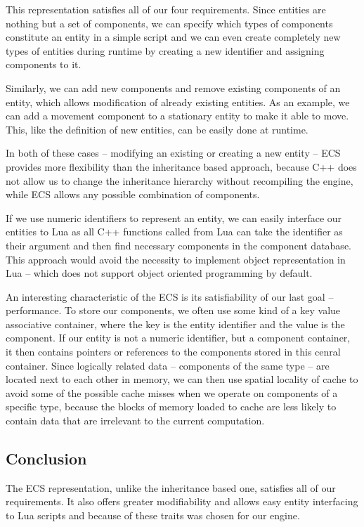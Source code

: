 This representation satisfies all of our four requirements. Since entities are nothing but a set of components, we can specify
which types of components constitute an entity in a simple script and we can even create completely new types of entities
during runtime by creating a new identifier and assigning components to it.

Similarly, we can add new components and remove existing components of an entity, which allows modification of already existing
entities. As an example, we can add a movement component to a stationary entity to make it able to move. This, like the definition
of new entities, can be easily done at runtime.

In both of these cases -- modifying an existing or creating a new entity -- ECS provides more flexibility than the inheritance
based approach, because C++ does not allow us to change the inheritance hierarchy without recompiling the engine, while
ECS allows any possible combination of components.

If we use numeric identifiers to represent an entity, we can easily interface our entities to Lua as all C++ functions
called from Lua can take the identifier as their argument and then find necessary components in the component database.
This approach would avoid the necessity to implement object representation in Lua -- which does not support object oriented
programming by default.

An interesting characteristic of the ECS is its satisfiability of our last goal -- performance. To store our components,
we often use some kind of a key value associative container, where the key is the entity identifier and the value is the component.
If our entity is not a numeric identifier, but a component container, it then contains pointers or references to the components
stored in this cenral container. Since logically related data -- components of the same type -- are located next to each other
in memory, we can then use spatial locality of cache to avoid some of the possible cache misses when we operate on components of a specific
type, because the blocks of memory loaded to cache are less likely to contain data that are irrelevant to the current computation.

\subsection{Conclusion}

The ECS representation, unlike the inheritance based one,  satisfies all of our requirements. It also offers greater modifiability and
allows easy entity interfacing to Lua scripts and because of these traits was chosen for our engine.

